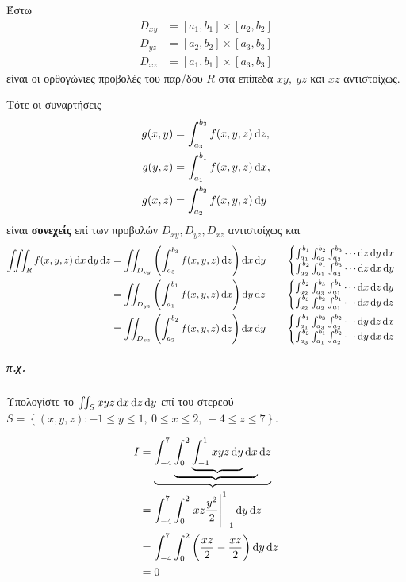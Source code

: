 \documentclass[11pt,a4paper,titlepage,draft]{article}
\begin{document}
Έστω \begin{align*}
D_{xy} &= [a_1,b_1]\times[a_2,b_2]\\
D_{yz} &= [a_2,b_2]\times[a_3,b_3]\\
D_{xz} &= [a_1,b_1]\times[a_3,b_3]
\end{align*}
είναι οι ορθογώνιες προβολές του παρ/δου \(R\) στα επίπεδα \(xy,\ yz\) και \(xz\) αντιστοίχως.

Τότε οι συναρτήσεις
\begin{align*}
g(x,y)&=\int_{a_3}^{b_3}f(x,y,z)\dif z,\\
g(y,z)&=\int_{a_1}^{b_1}f(x,y,z)\dif x,\\
g(x,z)&=\int_{a_2}^{b_2}f(x,y,z)\dif y
\end{align*}
είναι \textbf{συνεχείς} επί των προβολών \(D_{xy},D_{yz},D_{xz}\) αντιστοίχως και
\begin{align*}
\iiint_R f(x,y,z)\dif x \dif y \dif z & =
\iint_{D_{xy}} \left(
\int_{a_3}^{b_3} f(x,y,z) \dif z
\right) \dif x \dif y  \qquad
\begin{cases}
\int_{a_1}^{b_1}\int_{a_2}^{b_2}\int_{a_3}^{b_3} \cdots \dif z \dif y \dif x\\
\int_{a_2}^{b_2}\int_{a_1}^{b_1}\int_{a_3}^{b_3} \cdots \dif z \dif x \dif y
\end{cases}
\\
& =
\iint_{D_{yz}} \left(
\int_{a_1}^{b_1} f(x,y,z) \dif x
\right) \dif y \dif z \qquad \begin{cases}
\int_{a_2}^{b_2}\int_{a_3}^{b_3}\int_{a_1}^{b_1} \cdots \dif x \dif z \dif y\\
\int_{a_2}^{b_3}\int_{a_2}^{b_2}\int_{a_1}^{b_1} \cdots \dif x \dif y \dif z
\end{cases}\\
& =
\iint_{D_{xz}} \left(
\int_{a_2}^{b_2} f(x,y,z) \dif z
\right) \dif x \dif y \qquad
\begin{cases}
\int_{a_1}^{b_1}\int_{a_3}^{b_3}\int_{a_2}^{b_2} \cdots \dif y \dif z \dif x\\
\int_{a_3}^{b_3}\int_{a_1}^{b_1}\int_{a_2}^{b_2} \cdots \dif y \dif x \dif z
\end{cases}
\end{align*}

\subparagraph{π.χ.}
Υπολογίστε το \(\iint_S xyz \dif x \dif z \dif y\) επί του στερεού \(S= \left\lbrace (x,y,z): -1 \leq y \leq 1,\ 0\leq x \leq 2,\ -4 \leq z \leq 7  \right\rbrace\).

\begin{align*}
I &= \underbrace{\int_{-4}^7 \underbrace{\int_0^2 \underbrace{\int_{-1}^1 x y z \dif y} \dif x} \dif z}\\
&= \int_{-4}^7 \int_0^2 \left. xz \frac{y^2}{2}\right|_{-1}^1 \dif y \dif z\\
&= \int_{-4}^7 \int_0^2 \left( \frac{xz}{2} - \frac{xz}{2}\right) \dif y \dif z\\
&= 0
\end{align*}
\end{document}
